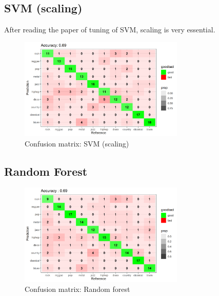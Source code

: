 \documentclass[12pt,a4paper]{article}
\begin{document}
\subsection{SVM (scaling)}
After reading the paper of tuning of SVM, scaling is very essential.
\begin{figure}[h]
    \begin{center}
        \includegraphics[width=0.7\textwidth]{confusionMatrix_svm_std.png}
    \end{center}
    \caption{Confusion matrix: SVM (scaling)}
\end{figure}
\newpage
\subsection{Random Forest}
\begin{figure}[h]
    \begin{center}
        \includegraphics[width=0.7\textwidth]{confusionMatrix_randomforest.png}
    \end{center}
    \caption{Confusion matrix: Random forest}
\end{figure}
\end{document}
